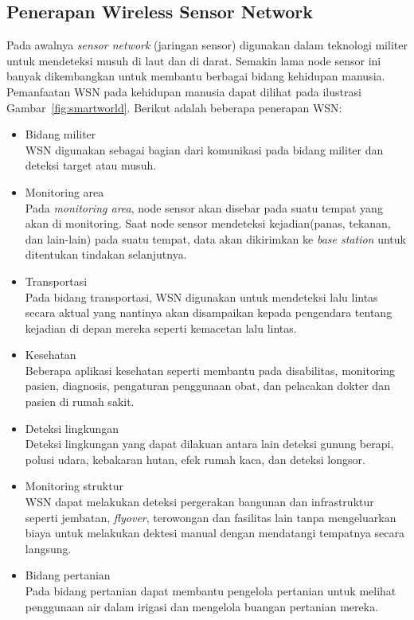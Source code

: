 \subsection{Penerapan Wireless Sensor Network}
Pada awalnya \textit{sensor network} (jaringan sensor) digunakan dalam teknologi militer untuk mendeteksi musuh di laut dan di darat. Semakin lama node sensor ini banyak dikembangkan untuk membantu berbagai bidang kehidupan manusia. Pemanfaatan WSN pada kehidupan manusia dapat dilihat pada ilustrasi Gambar~\ref{fig:smartworld}. Berikut adalah beberapa penerapan WSN:
\begin{itemize}
\item Bidang militer\\
WSN digunakan sebagai bagian dari komunikasi pada bidang militer dan deteksi target atau musuh.

\item Monitoring area\\
Pada \textit{monitoring area}, node sensor akan disebar pada suatu tempat yang akan di monitoring. Saat node sensor mendeteksi kejadian(panas, tekanan, dan lain-lain) pada suatu tempat, data akan dikirimkan ke \textit{base station} untuk ditentukan tindakan selanjutnya.

\item Transportasi\\
Pada bidang transportasi, WSN digunakan untuk mendeteksi lalu lintas secara aktual yang nantinya akan disampaikan kepada pengendara tentang kejadian di depan mereka seperti kemacetan lalu lintas. 

\item Kesehatan\\
Beberapa aplikasi kesehatan seperti membantu pada disabilitas, monitoring pasien, diagnosis, pengaturan penggunaan obat, dan pelacakan dokter dan pasien di rumah sakit.

\item Deteksi lingkungan\\
Deteksi lingkungan yang dapat dilakuan antara lain deteksi gunung berapi, polusi udara, kebakaran hutan, efek rumah kaca, dan deteksi longsor.

\item Monitoring struktur\\
WSN dapat melakukan deteksi pergerakan bangunan dan infrastruktur seperti jembatan, \textit{flyover}, terowongan dan fasilitas lain tanpa mengeluarkan biaya untuk melakukan dektesi manual dengan mendatangi tempatnya secara langsung.

\item Bidang pertanian\\
Pada bidang pertanian dapat membantu pengelola pertanian untuk melihat penggunaan air dalam irigasi dan mengelola buangan pertanian mereka.
\end{itemize}

